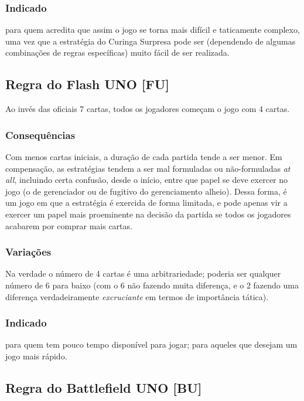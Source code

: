 \subsubsection{Indicado}

para quem acredita que assim o jogo se torna mais difícil e taticamente complexo, uma vez que a estratégia do Curinga Surpresa pode ser (dependendo de algumas combinações de regras específicas) muito fácil de ser realizada.

\subsection{Regra do Flash UNO [FU]}

Ao invés das oficiais 7 cartas, todos os jogadores começam o jogo com 4 cartas.

\subsubsection{Consequências}

Com menos cartas iniciais, a duração de cada partida tende a ser menor. Em compensação, as estratégias tendem a ser mal formuladas ou não-formuladas \emph{at all}, incluindo certa confusão, desde o início, entre que papel se deve exercer no jogo (o de gerenciador ou de fugitivo do gerenciamento alheio). Dessa forma, é um jogo em que a estratégia é exercida de forma limitada, e pode apenas vir a exercer um papel mais proeminente na decisão da partida se todos os jogadores acabarem por comprar mais cartas.	

\subsubsection{Variações}

Na verdade o número de 4 cartas é uma arbitrariedade; poderia ser qualquer número de 6 para baixo (com o 6 não fazendo muita diferença, e o 2 fazendo uma diferença verdadeiramente \emph{excruciante} em termos de importância tática).

\subsubsection{Indicado}

para quem tem pouco tempo disponível para jogar; para aqueles que desejam um jogo mais rápido.

\subsection{Regra do Battlefield UNO [BU]}


